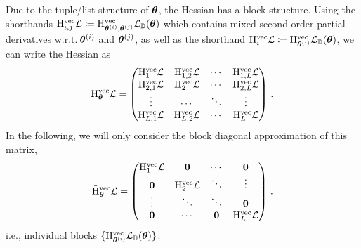 Due to the tuple/list structure of ${\bm{\theta}}$, the Hessian has a block structure.
Using the shorthands $\mathrm{H}_{i,j}^{\operatorname{vec}} {\mathcal{L}} \coloneq \mathrm{H}_{{\bm{\theta}}^{(i)}, {\bm{\theta}}^{(j)}}^{\operatorname{vec}} {\mathcal{L}}_{{\mathbb{D}}}({\bm{\theta}})$
which contains mixed second-order partial derivatives w.r.t.\,${\bm{\theta}}^{(i)}$ and ${\bm{\theta}}^{(j)}$, as well as the shorthand $\mathrm{H}_{i}^{\operatorname{vec}} {\mathcal{L}} \coloneq \mathrm{H}_{{\bm{\theta}}^{(i)}}^{\operatorname{vec}} {\mathcal{L}}_{{\mathbb{D}}}({\bm{\theta}})$, we can write the Hessian as
\begin{align*}
  \mathrm{H}_{{\bm{\theta}}}^{\operatorname{vec}} {\mathcal{L}}
  =
  \begin{pmatrix}
    \mathrm{H}_1^{\operatorname{vec}} {\mathcal{L}}
    &
      \mathrm{H}_{1, 2}^{\operatorname{vec}} {\mathcal{L}}
    &
      \cdots
    &
      \mathrm{H}_{1, L}^{\operatorname{vec}} {\mathcal{L}}
    \\
    \mathrm{H}_{2, 1}^{\operatorname{vec}} {\mathcal{L}}
    &
      \mathrm{H}_2^{\operatorname{vec}} {\mathcal{L}}
    &
      \cdots
    &
      \mathrm{H}_{2, L}^{\operatorname{vec}} {\mathcal{L}}
    \\
    \vdots & \cdots & \ddots & \vdots
    \\
    \mathrm{H}_{L, 1}^{\operatorname{vec}} {\mathcal{L}}
    &
      \mathrm{H}_{L, 2}^{\operatorname{vec}} {\mathcal{L}}
    &
      \cdots
    &
      \mathrm{H}_L^{\operatorname{vec}} {\mathcal{L}}
  \end{pmatrix}\,.
\end{align*}
In the following, we will only consider the block diagonal approximation of this matrix,
\begin{align*}
  \tilde{\mathrm{H}}_{{\bm{\theta}}}^{\operatorname{vec}} {\mathcal{L}}
  =
  \begin{pmatrix}
    \mathrm{H}_1^{\operatorname{vec}} {\mathcal{L}} & {\bm{0}} & \cdots & {\bm{0}}
    \\
    {\bm{0}} & \mathrm{H}_2^{\operatorname{vec}} {\mathcal{L}} & \ddots & \vdots
    \\
    \vdots & \ddots & \ddots & {\bm{0}}
    \\
    {\bm{0}} & \cdots & {\bm{0}} & \mathrm{H}_L^{\operatorname{vec}} {\mathcal{L}}
  \end{pmatrix}\,.
\end{align*}
i.e., individual blocks $\{ \mathrm{H}_{{\bm{\theta}}^{(i)}}^{\operatorname{vec}} {\mathcal{L}}_{{\mathbb{D}}}({\bm{\theta}})\}$.
